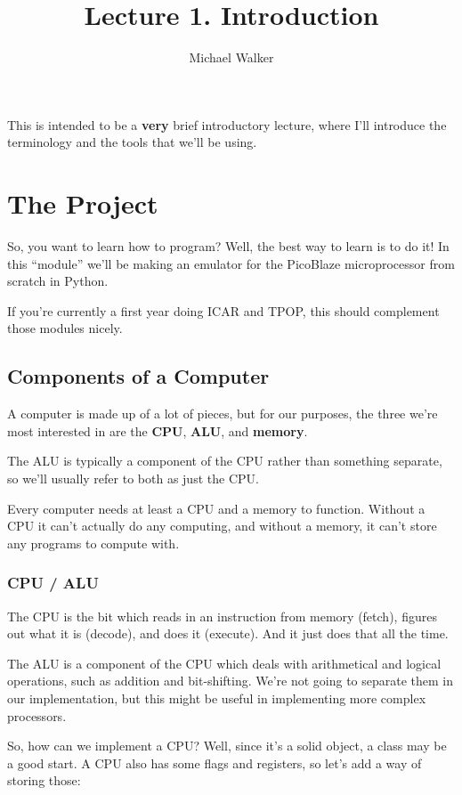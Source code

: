 \documentclass[12pt,a4paper]{article}
\author{Michael Walker}
\title{Lecture 1. Introduction}
\date{}
\begin{document}
\maketitle{}

This is intended to be a \textbf{very} brief introductory lecture,
where I'll introduce the terminology and the tools that we'll be
using.

\tableofcontents

\pagebreak
\section{The Project}

So, you want to learn how to program? Well, the best way to learn is
to do it! In this ``module'' we'll be making an emulator for the
PicoBlaze microprocessor from scratch in Python.

If you're currently a first year doing ICAR and TPOP, this should
complement those modules nicely.

\pagebreak
\subsection{Components of a Computer}

A computer is made up of a lot of pieces, but for our purposes, the
three we're most interested in are the \textbf{CPU}, \textbf{ALU}, and
\textbf{memory}.

The ALU is typically a component of the CPU rather than something
separate, so we'll usually refer to both as just the CPU.

Every computer needs at least a CPU and a memory to function. Without
a CPU it can't actually do any computing, and without a memory, it
can't store any programs to compute with.

\subsubsection{CPU / ALU}

The CPU is the bit which reads in an instruction from memory (fetch),
figures out what it is (decode), and does it (execute). And it just
does that all the time.

The ALU is a component of the CPU which deals with arithmetical and
logical operations, such as addition and bit-shifting. We're not going
to separate them in our implementation, but this might be useful in
implementing more complex processors.

So, how can we implement a CPU? Well, since it's a solid object, a
class may be a good start. A CPU also has some flags and registers,
so let's add a way of storing those:
\end{document}
